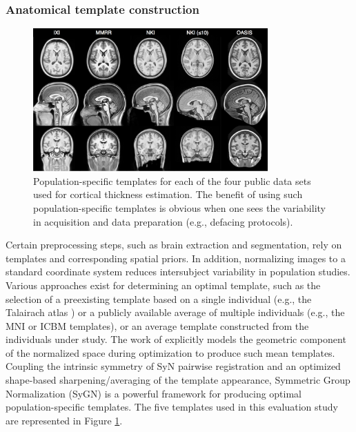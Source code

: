 \subsubsection{Anatomical template construction}

\begin{figure}
  \centering
  \includegraphics[width=90mm]{Figures/templates.jpg}
  \caption{Population-specific templates for each of the four public data sets used
  for cortical thickness 
  estimation. %
  The benefit of using such population-specific templates is obvious when one sees the variability in
  acquisition and data preparation (e.g., defacing protocols).
  }
  \label{fig:template}
\end{figure}

Certain preprocessing steps, such as brain extraction and
segmentation, rely on templates and corresponding spatial priors. 
In addition, normalizing images to a standard coordinate system
reduces intersubject variability in population studies.  Various
approaches exist for determining an optimal template,
such as the selection of a preexisting template based on a single individual
(e.g., the Talairach atlas \citep{Talairach1988}) or a publicly available average of multiple individuals
(e.g., the MNI \citep{Collins1994} or ICBM \citep{Mazziotta1995}
templates), or an average template constructed from the individuals under study.
The work of \cite{avants2010} explicitly models the geometric component of the 
normalized space during optimization to produce such mean templates.  Coupling the intrinsic symmetry of 
SyN pairwise registration \citep{avants2011} and an
optimized shape-based sharpening/averaging of the template appearance, Symmetric Group Normalization (SyGN) is a powerful framework for producing optimal population-specific templates. The five templates used in this evaluation
study are represented in Figure \ref{fig:template}.


